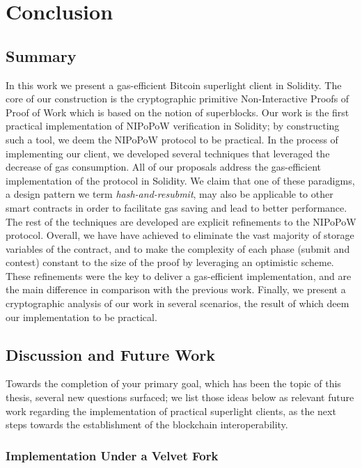 \chapter{Conclusion} \section{Summary}

In this work we present a gas-efficient Bitcoin superlight client in Solidity.
The core of our construction is the cryptographic primitive Non-Interactive
Proofs of Proof of Work which is based on the notion of superblocks. Our work
is the first practical implementation of NIPoPoW verification in Solidity; by
constructing such a tool, we deem the NIPoPoW protocol to be practical. In the
process of implementing our client, we developed several techniques that
leveraged the decrease of gas consumption. All of our proposals address the
gas-efficient implementation of the protocol in Solidity. We claim that one of
these paradigms, a design pattern we term \emph{hash-and-resubmit}, may also be
applicable to other smart contracts in order to facilitate gas saving and lead
to better performance. The rest of the techniques are developed are explicit
refinements to the NIPoPoW protocol. Overall, we have have achieved to
eliminate the vast majority of storage variables of the contract, and to make
the complexity of each phase (submit and contest) constant to the size of the
proof by leveraging an optimistic scheme. These refinements were the key to
deliver a gas-efficient implementation, and are the main difference in
comparison with the previous work. Finally, we present a cryptographic analysis
of our work in several scenarios, the result of which deem our
implementation to be practical.

\section{Discussion and Future Work}

Towards the completion of your primary goal, which has been the topic of this
thesis, several new questions surfaced; we list those ideas below as relevant
future work regarding the implementation of practical superlight clients, as
the next steps towards the establishment of the blockchain interoperability.

\subsection{Implementation Under a Velvet Fork}

